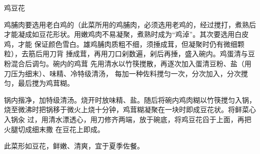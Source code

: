 \begin{recipe}{鸡豆花\protect\footnotemark}

\ingredients


\preparation

\step 鸡脯肉要选用老白鸡的（此菜所用的鸡脯肉，必须选用老鸡的，经过搅打，煮熟后
才能凝成如豆花形状。用嫩鸡肉不易凝聚，煮熟时成为“鸡淖”。其次要选用白皮鸡，才能
保证颜色雪白。雄鸡脯肉质粗不细，须捶成茸，但凝聚时仍有微细颗粒），去筋后用刀背
捶成茸，再用刀口剁数遍，剁后再捶，盛入碗内。鸡蛋清与豆粉混合后调匀。碗内的鸡茸
先用清水以竹筷搅散，再逐次加入蛋清豆粉、盐（用刀压为细末）、味精、冷特级清汤，
每加一种佐料搅匀一次，分次加入，分次搅匀，最后搅为鸡茸糊。

\step 锅内揩净，加特级清汤。烧开时放味精、盐。随后将碗内鸡肉糊以竹筷搅匀入锅，
烧至微沸时把锅移于微火上烧十分钟，鸡茸糊凝聚在一块时即成豆花状。将鲜菜心入锅汆
过，用清水漂透心，用刀修齐两端，放于碗底，将鸡豆花舀于上面，再把火腿切成细末撒
在豆花上即成。

\features

此菜形如豆花，鲜嫩、清爽，宜于夏季佐餐。


\end{recipe}

